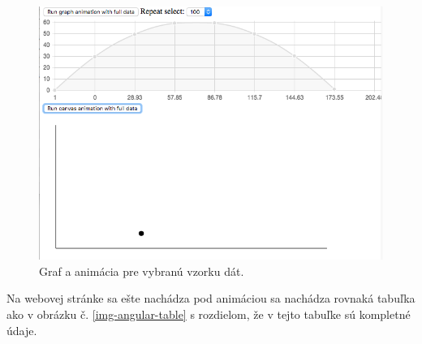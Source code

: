 \begin{figure}[H]
  \centering
  \includegraphics[scale=0.5]{img/code/angular-fulldata.png}
  \caption{Graf a animácia pre vybranú vzorku dát.}
  \label{img-angular-fulldata}
\end{figure}

Na webovej stránke sa ešte nachádza pod animáciou sa nachádza rovnaká tabuľka ako v obrázku č. \ref{img-angular-table} s rozdielom, že v tejto tabuľke sú kompletné údaje.


